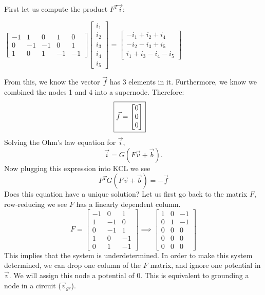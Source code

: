 \documentclass[letter]{article}
\newenvironment{menumerate}{\edef\backupindent{\the\parindent}
  \enumerate\setlength{\parindent}{\backupindent}}
  {\endenumerate}
\begin{document}
\begin{menumerate}
\begin{menumerate}
        First let us compute the product $F^T\vec{i}:$
        \begin{center}
        $\begin{bmatrix}
        -1&1&0&1&0\\
        0&-1&-1&0&1\\
        1&0&1&-1&-1
        \end{bmatrix}
        \begin{bmatrix}
        i_1\\i_2\\i_3\\i_4\\i_5
        \end{bmatrix}
        =
        \begin{bmatrix}
        -i_1+i_2+i_4\\-i_2-i_3+i_5\\i_1+i_3-i_4-i_5
        \end{bmatrix}$
        \end{center}
        From this, we know the vector $\vec{f}$ has 3 elements in it. Furthermore, we know we combined the nodes 1 and 4 into a supernode. Therefore:
        \begin{align}
            \Aboxed{\vec{f} =
            \begin{bmatrix}
            0\\0\\0
            \end{bmatrix}}
        \end{align}
        Solving the Ohm’s law equation for $\vec{i}$,
        \begin{equation*}
            \vec{i} = G(F\vec{v} + \vec{b}).
        \end{equation*}
        Now plugging this expression into KCL we see
        \begin{equation*}
            F^TG(F\vec{v} + \vec{b}) = -\vec{f}
        \end{equation*}
        Does this equation have a unique solution?
        Let us first go back to the matrix $F$, row-reducing we see $F$ has a linearly dependent column.
        \begin{equation*}
            F = \begin{bmatrix} -1&0&1\\1&-1&0\\0&-1&1\\1&0&-1\\0&1&-1\end{bmatrix} \implies \begin{bmatrix} 1&0&-1\\0&1&-1\\0&0&0\\0&0&0\\0&0&0\end{bmatrix}
        \end{equation*}
        This implies that the system is underdetermined. In order to make this system determined, we can drop one column of the $F$ matrix, and ignore one potential in $\vec{v}$. We will assign this node a potential of 0. This is equivalent to grounding a node in a circuit ($\vec{v}_{gr}$).


\end{menumerate}
\end{menumerate}
\end{document}
